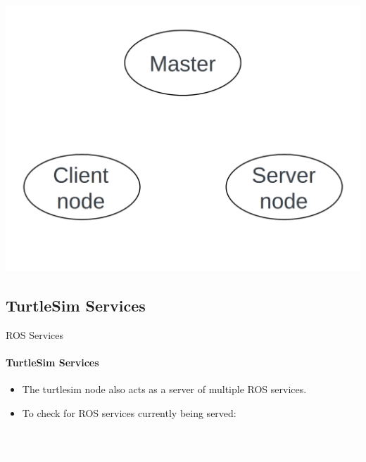 \documentclass{beamer}
\begin{document}
\begin{frame}[plain]{}
    \centering
    \includegraphics[width =1.0\linewidth]{figures/service1.png}                                                              
  \end{frame}       

\subsection{TurtleSim Services}

\begin{frame}{ROS Services}
    \framesubtitle{TurtleSim Services}
    \begin{itemize}
        \item The {\ttfamily turtlesim} node also acts as a server of multiple ROS services.
        \item To check for ROS services currently being served:
    \begin{terminal}
        \color{green} 
    \end{terminal}
    \end{itemize}
\end{frame}

\begin{frame}[plain]{}  
    \centering
    {\huge \textcolor{white}{Example \\ (TurtleSim services)} }
\end{frame}
\end{document}
